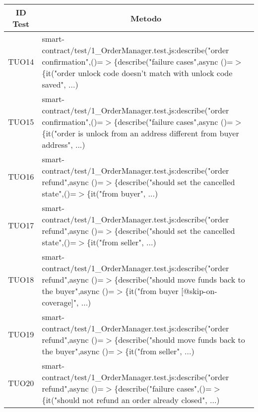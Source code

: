 \begin{table}[H]
  \centering
  \renewcommand{\arraystretch}{1.8}
  \begin{tabular}{c|p{15cm}}
    \rowcolor[HTML]{125E28}
    \color[HTML]{FFFFFF}\textbf{ID Test}
         & \multicolumn{1}{c}{\color[HTML]{FFFFFF}\textbf{Metodo}}                                                                                       \\
    \hline
    TUO14 & smart-contract/test/1\_OrderManager.test.js:describe("order confirmation",\newline()=$>$\{describe("failure cases",async ()=$>$\{it("order unlock code doesn't match with unlock code saved", ...)                                                               \\
    TUO15 & smart-contract/test/1\_OrderManager.test.js:describe("order confirmation",\newline()=$>$\{describe("failure cases",async ()=$>$\{it("order is unlock from an address different from buyer address", ...)                                                         \\
    TUO16 & smart-contract/test/1\_OrderManager.test.js:describe("order refund",\newline async ()=$>$\{describe("should set the cancelled state",()=$>$\{it("from buyer", ...)                                                                               \\
    TUO17 & smart-contract/test/1\_OrderManager.test.js:describe("order refund",\newline async ()=$>$\{describe("should set the cancelled state",()=$>$\{it("from seller", ...)                                                                             \\
    TUO18 & smart-contract/test/1\_OrderManager.test.js:describe("order refund",\newline async ()=$>$\{describe("should move funds back to the buyer",async ()=$>$\{it("from buyer [@skip-on-coverage]", ...)                                                                              \\
    TUO19 & smart-contract/test/1\_OrderManager.test.js:describe("order refund",\newline async ()=$>$\{describe("should move funds back to the buyer",async ()=$>$\{it("from seller", ...)                                                                            \\
    TUO20 & smart-contract/test/1\_OrderManager.test.js:describe("order refund",\newline async ()=$>$\{describe("failure cases",()=$>$\{it("should not refund an order already closed", ...)                                                 \\

\end{tabular}
\end{table}
